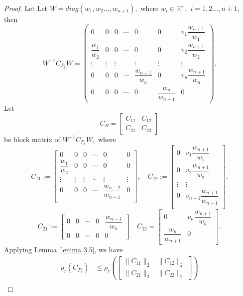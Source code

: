 \documentclass [12pt]{article}
\begin{document}
\begin{proof}
	Let Let $W=diag\left({w_{1}},{w_{2}}\dots,{w_{n+1}}\right),$ where $w_{i} \in \mathbb{R}^+,$ $i=1,2\dots,n+1$, then
	\[
	W^{-1} C_{P_{r}} W = 
	\begin{pmatrix}
		0 & 0 & 0 & \cdots&0&0 & v_{1}\dfrac{w_{n+1}}{w_{1}} \\
		\dfrac{w_{1}}{w_{2}} & 0 & 0 & \cdots& 0&0 & v_{2}\dfrac{w_{n+1}}{w_{2}} \\
		\vdots & \vdots & \vdots &  & \vdots& \vdots&\vdots \\
		0 & 0 & 0 & \cdots &\dfrac{w_{n-1}}{w_{n}}&0& v_{n}\dfrac{w_{n+1}}{w_{n}} \\
		0  & 0& 0 & \cdots &0& \dfrac{w_{n}}{w_{n+1}}&0
	\end{pmatrix}
.	\]
	Let \[C_{B}=\begin{bmatrix}
		C_{11} & C_{12} \\
		C_{21} & C_{22}
	\end{bmatrix}\] be block matrix of $W^{-1}C_{P_{r}}W,$
	where \[
	C_{11} := 
	\begin{bmatrix}
		0 &0 & 0 & \cdots & 0&0\\
		\dfrac{w_{1}}{w_{2}} & 0 &0& \cdots &0&0   \\
		\vdots & \vdots & \vdots & \ddots & \vdots&\vdots \\
		0 & 0 & 0 & \cdots & \dfrac{w_{n-2}}{w_{n-1}}&0 \\
	\end{bmatrix},
	\quad C_{12} := 
	\begin{bmatrix}
		0 & v_{1}\dfrac{w_{n+1}}{w_{1}} \\
		0 & v_{2}\dfrac{w_{n+1}}{w_{2}} \\
		\vdots&\vdots \\ 
		0& v_{n-1}\dfrac{w_{n+1}}{w_{n-1}} \\
	\end{bmatrix}. \]          
	\[C_{21} := \begin{bmatrix}
		0 &0&\cdots& 0 &\dfrac{w_{n-1}}{w_{n}}\\0 &0&\cdots& 0 &0
	\end{bmatrix}\quad 
	C_{22}=\begin{bmatrix}
		0 &v_{n}\dfrac{w_{n+1}}{w_{n}}\\ \dfrac{w_{n}}{w_{n+1}}&0
	\end{bmatrix}.\]
	Applying Lemma \ref{lemma 3.5}, we have
	\begin{align*}
		\rho_{r}(C_{P_{r}}) &\leq \rho_{r}\left(\left[\begin{array}{cc} \|C_{11}\|_{2} & \|C_{12}\|_{2} \\ \|C_{21}\|_{2} & \|C_{22}\|_{2} \end{array}\right]\right) \\

\end{align*}
\end{proof}
\end{document}
